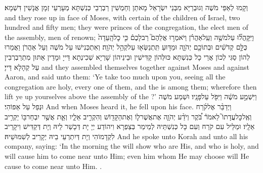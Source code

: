 {וְקָמוּ לְאַפֵּי מֹשֶׁה וְגוּבְרַיָּא מִבְּנֵי יִשְׂרָאֵל מָאתַן וְחַמְשִׁין רַבְרְבֵי כְּנִשְׁתָּא מְעָרְעֵי זְמָן אֲנָשִׁין דִּשְׁמָא׃}
{and they rose up in face of Moses, with certain of the children of Israel, two hundred and fifty men; they were princes of the congregation, the elect men of the assembly, men of renown;}{}
{וַיִּֽקָּהֲל֞וּ עַל\maqqaf מֹשֶׁ֣ה וְעַֽל\maqqaf אַהֲרֹ֗ן וַיֹּאמְר֣וּ אֲלֵהֶם֮ רַב\maqqaf לָכֶם֒ כִּ֤י כׇל\maqqaf הָֽעֵדָה֙ כֻּלָּ֣ם קְדֹשִׁ֔ים וּבְתוֹכָ֖ם יְהֹוָ֑ה וּמַדּ֥וּעַ תִּֽתְנַשְּׂא֖וּ עַל\maqqaf קְהַ֥ל יְהֹוָֽה׃}
{וְאִתְכְּנִישׁוּ עַל מֹשֶׁה וְעַל אַהֲרֹן וַאֲמַרוּ לְהוֹן סַגִּי לְכוֹן אֲרֵי כָל כְּנִשְׁתָּא כּוּלְּהוֹן קַדִּישִׁין וּבֵינֵיהוֹן שָׁרְיָא שְׁכִינְתָא דַּייָ וּמָדֵין אַתּוּן מִתְרַבְרְבִין עַל קְהָלָא דַּייָ׃}
{and they assembled themselves together against Moses and against Aaron, and said unto them: ‘Ye take too much upon you, seeing all the congregation are holy, every one of them, and the \lord\space is among them; wherefore then lift ye up yourselves above the assembly of the \lord?’}{}
{וַיִּשְׁמַ֣ע מֹשֶׁ֔ה וַיִּפֹּ֖ל עַל\maqqaf פָּנָֽיו׃}
{וּשְׁמַע מֹשֶׁה וּנְפַל עַל אַפּוֹהִי׃}
{And when Moses heard it, he fell upon his face.}{}
{וַיְדַבֵּ֨ר אֶל\maqqaf קֹ֜רַח וְאֶֽל\maqqaf כׇּל\maqqaf עֲדָתוֹ֮ לֵאמֹר֒ בֹּ֠קֶר וְיֹדַ֨ע יְהֹוָ֧ה אֶת\maqqaf אֲשֶׁר\maqqaf ל֛וֹ וְאֶת\maqqaf הַקָּד֖וֹשׁ וְהִקְרִ֣יב אֵלָ֑יו וְאֵ֛ת אֲשֶׁ֥ר יִבְחַר\maqqaf בּ֖וֹ יַקְרִ֥יב אֵלָֽיו׃}
{וּמַלֵּיל עִם קֹרַח וְעִם כָּל כְּנִשְׁתֵּיהּ לְמֵימַר בְּצַפְרָא וִיהוֹדַע יְיָ יָת דְּכָשַׁר לֵיהּ וְיָת דְּקַדִּישׁ וִיקָרֵיב לִקְדָמוֹהִי וְיָת דְּיִתְרְעֵי בֵיהּ יְקָרֵיב לְשִׁמּוּשֵׁיהּ׃}
{And he spoke unto Korah and unto all his company, saying: ‘In the morning the \lord\space will show who are His, and who is holy, and will cause him to come near unto Him; even him whom He may choose will He cause to come near unto Him. .}{}
